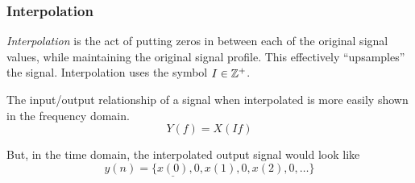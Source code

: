 \subsubsection{Interpolation}\label{subsubsec:Interpolation}
\begin{definition}[Interpolation]\label{def:Interpolation}
  \emph{Interpolation} is the act of putting zeros in between each of the original signal values, while maintaining the original signal profile.
  This effectively ``upsamples'' the signal.
  Interpolation uses the symbol $I \in \operatorname{\mathbb{Z}^{+}}$.

  The input/output relationship of a signal when interpolated is more easily shown in the frequency domain.
  \begin{equation}\label{eq:Interpolation}
    Y(f) = X(If)
  \end{equation}

  But, in the time domain, the interpolated output signal would look like
  \begin{equation*}
    y(n) = \lbrace \underline{x(0)}, 0, x(1), 0, x(2), 0, \ldots \rbrace
  \end{equation*}
\end{definition}

